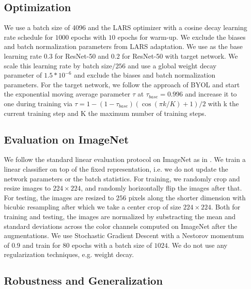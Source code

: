 \documentclass{article}
\begin{document}
\subsection{Optimization}
We use a batch size of 4096 and the LARS optimizer \citep{you2017large} with a cosine decay learning rate schedule \citep{Loshchilov2017SGDRSG} for $1000$ epochs with $10$ epochs for warm-up. 
We exclude the biases and batch normalization parameters from LARS adaptation.
We use as the base learning rate $0.3$ for ResNet-50 and $0.2$ for ResNet-50 with target network.
We scale this learning rate by batch size$/256$ and use a global weight decay parameter of
$1.5*10^{-6}$ and exclude the biases and batch normalization parameters.
For the target network, we follow the approach of BYOL \citep{grill2020bootstrap} and start the exponential moving average parameter $\tau$ at $\tau_{base} = 0.996$ and increase it to one during training via $\tau = 1 - (1 - \tau_{base})(\cos(\pi k/K) + 1)/2$ with k the current training
step and K the maximum number of training steps.
 
\subsection{Evaluation on ImageNet} \label{sec:linear_imagenet_app}

We follow the standard linear evaluation protocol on ImageNet as in \citep{Kolesnikov2019RevisitingSV,chen2020simple,grill2020bootstrap}.
We train a linear classifier on top of the fixed representation, i.e. we do not update the network parameters or the batch statistics.
For training, we randomly crop and resize images to $224\times224$, and randomly horizontally flip the images after that.
For testing, the images are resized to $256$ pixels along the shorter dimension with bicubic resampling after which we take a center crop of size $224\times224$.
Both for training and testing, the images are normalized by substracting the mean and standard deviations across the color channels computed on ImageNet after the augmentations.
We use Stochastic Gradient Descent with a Nestorov momentum of $0.9$ and train for $80$ epochs with a batch size of $1024$.
We do not use any regularization techniques, e.g. weight decay.

\subsection{Robustness and Generalization}  \label{sec:robust_app}
\end{document}
